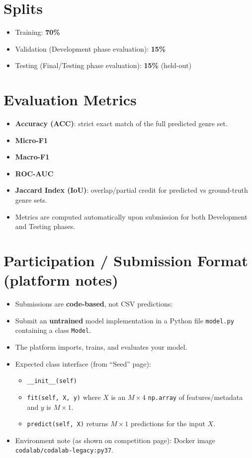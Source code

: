 \documentclass[11pt]{article}
\begin{document}
\section{Splits}
\begin{itemize}[leftmargin=*]
  \item Training: \textbf{70\%}
  \item Validation (Development phase evaluation): \textbf{15\%}
  \item Testing (Final/Testing phase evaluation): \textbf{15\%} (held-out)
\end{itemize}

\section{Evaluation Metrics}
\begin{itemize}[leftmargin=*]
  \item \textbf{Accuracy (ACC)}: strict exact match of the full predicted genre set.
  \item \textbf{Micro-F1}
  \item \textbf{Macro-F1}
  \item \textbf{ROC-AUC}
  \item \textbf{Jaccard Index (IoU)}: overlap/partial credit for predicted vs ground-truth genre sets.
  \item Metrics are computed automatically upon submission for both Development and Testing phases.
\end{itemize}

\section{Participation / Submission Format (platform notes)}
\begin{itemize}[leftmargin=*]
  \item Submissions are \textbf{code-based}, not CSV predictions:
  \item Submit an \textbf{untrained} model implementation in a Python file \texttt{model.py} containing a class \texttt{Model}.
  \item The platform imports, trains, and evaluates your model.
  \item Expected class interface (from ``Seed'' page):
  \begin{itemize}
    \item \texttt{\_\_init\_\_(self)}
    \item \texttt{fit(self, X, y)} where \(X\) is an \(M \times 4\) \texttt{np.array} of features/metadata and \(y\) is \(M \times 1\).
    \item \texttt{predict(self, X)} returns \(M \times 1\) predictions for the input \(X\).
  \end{itemize}
  \item Environment note (as shown on competition page): Docker image \texttt{codalab/codalab-legacy:py37}.
\end{itemize}
\end{document}
